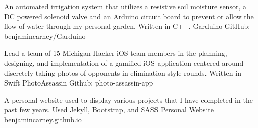 \vspace{1mm}

	\cventry
	{An automated irrigation system that utilizes a resistive soil moisture sensor, a DC powered solenoid valve and an Arduino circuit board to prevent or allow the flow of water through my personal garden. Written in C++.}
	{Garduino}
	{GitHub: benjamincarney/Garduino}
	{}
	{}

	\vspace{-5.5mm}
	\cventry
	{Lead a team of 15 Michigan Hacker iOS team members in the planning, designing, and implementation of a gamified iOS application centered around discretely taking photos of opponents in elimination-style rounds. Written in Swift}
	{PhotoAssassin}
	{Github: photo-assassin-app}
	{}
	{}
	
		\vspace{-6mm}
	\cventry
	{A personal website used to display various projects that I have completed in the past few years. Used Jekyll, Bootstrap, and SASS}
	{Personal Website}
	{benjamincarney.github.io}
	{}
	{}
	

	
	\vspace{-5mm}